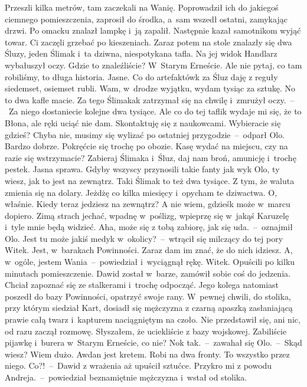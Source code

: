 \documentclass[../MAIN.tex]{subfiles}
\begin{document}
Przeszli kilka metrów, tam zaczekali na Wanię. Poprowadził ich do jakiegoś ciemnego pomieszczenia, zaprosił do środka, a~sam wszedł ostatni, zamykając drzwi. Po omacku znalazł lampkę i~ją zapalił. Następnie kazał samotnikom wyjąć towar. Ci zaczęli grzebać po kieszeniach. Zaraz potem na stole znalazły się dwa Śluzy, jeden Ślimak i~ta dziwna, niespotykana tafla. Na jej widok Handlarz wybałuszył oczy.
\sx Gdzie to znaleźliście?
\xx W~Starym Erneście. Ale nie pytaj, co tam robiliśmy, to długa historia.
\xx Jasne. Co do artefaktów\3k za Śluz daję z reguły siedemset, osiemset rubli. Wam, w~drodze wyjątku, wydam tysiąc za sztukę. No to dwa kafle macie. Za tego Ślimaka\3k \xx zatrzymał się na chwilę i~zmrużył oczy.~--~Za niego dostaniecie kolejne dwa tysiące. Ale co do tej tafli\3k wydaje mi się, że to Błona, ale ręki uciąć nie dam. Skontaktuję się z naukowcami. Wybieracie się gdzieś?
\xx Chyba nie, musimy się wylizać po ostatniej przygodzie~--~odparł Olo.
\xx Bardzo dobrze. Pokręćcie się trochę po obozie. Kasę wydać na miejscu, czy na razie się wstrzymacie?
\xx Zabieraj Ślimaka i~Śluz, daj nam broń, amunicję i~trochę pestek.
\xx Jasna sprawa. Gdyby wszyscy przynosili takie fanty jak wy\3k Olo, ty wiesz, jak to jest na zewnątrz. Taki Ślimak to też dwa tysiące. Z tym, że waluta zmienia się na dolary. Jeżdżę co kilka miesięcy i~opycham te dziwactwa.
\xx O, właśnie. Kiedy teraz jedziesz na zewnątrz?
\xx A nie wiem, gdzieś\3k może w~marcu dopiero. Zimą strach jechać, wpadnę w~poślizg, wpieprzę się w~jakąś Karuzelę i~tyle mnie będą widzieć.
\xx Aha, może się z tobą zabiorę, jak się uda.~--~oznajmił Olo.
\xx Jest tu może jakiś medyk w~okolicy?~--~wtrącił się milczący do tej pory Witek.
\xx Jest, w~barakach Powinności. Zaraz dam im znać, że do nich idziesz. A, w~ogóle, jestem Wania~--~powiedział i~wyciągnął rękę.
\xx Witek.
\qm
Opuścili po kilku minutach pomieszczenie. Dawid został w~barze, zamówił sobie coś do jedzenia. Chciał zapoznać się ze stalkerami i~trochę odpocząć. Jego kolega natomiast poszedł do bazy Powinności, opatrzyć swoje rany. W~pewnej chwili, do stolika, przy którym siedział Kart, dosiadł się mężczyzna z czarną apaszką zasłaniającą prawie całą twarz i~kapturem naciągniętym na czoło. Nie przedstawił się, ani nic, od razu zaczął rozmowę.
\sx Słyszałem, że uciekliście z bazy wojskowej. Zabiliście pijawkę i~burera w~Starym Erneście, co nie?
\xx No\3k tak.~--~zawahał się Olo.~--~Skąd wiesz?
\xx Wiem dużo. Awdan jest kretem. Robi na dwa fronty. To wszystko przez niego.
\xx Co?!~--~Dawid z wrażenia aż upuścił sztućce.
\xx Przykro mi z powodu Andreja.~--~powiedział beznamiętnie mężczyzna i~wstał od stolika.
\end{document}
